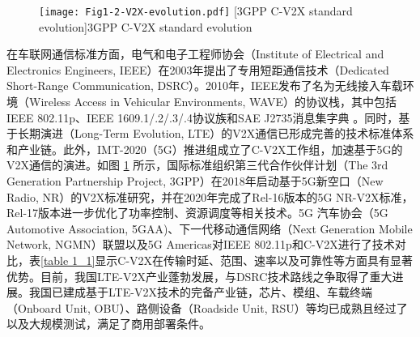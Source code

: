 \begin{figure}[h]
	\centering
\texttt{[image: Fig1-2-V2X-evolution.pdf]}
	[3GPP C-V2X standard evolution]{3GPP C-V2X standard evolution}
	\label{fig 1-2}
\end{figure}

在车联网通信标准方面，电气和电子工程师协会（Institute of Electrical and Electronics Engineers, IEEE）在2003年提出了专用短距通信技术（Dedicated Short-Range Communication, DSRC）。2010年，IEEE发布了名为无线接入车载环境（Wireless Access in Vehicular Environments, WAVE）的协议栈，其中包括IEEE 802.11p、IEEE 1609.1/.2/.3/.4协议族和SAE J2735消息集字典 \cite{wu2013vehicular}。同时，基于长期演进（Long-Term Evolution, LTE）的V2X通信已形成完善的技术标准体系和产业链\cite{chen2016lte}。此外，IMT-2020（5G）推进组成立了C-V2X工作组，加速基于5G的V2X通信的演进。如图 \ref{fig 1-2} 所示，国际标准组织第三代合作伙伴计划（The 3rd Generation Partnership Project, 3GPP）在2018年启动基于5G新空口（New Radio, NR）的V2X标准研究，并在2020年完成了Rel-16版本的5G NR-V2X标准\cite{saad2021advancements}，Rel-17版本进一步优化了功率控制、资源调度等相关技术。5G 汽车协会（5G Automotive Association, 5GAA)、下一代移动通信网络（Next Generation Mobile Network, NGMN）联盟以及5G Americas对IEEE 802.11p和C-V2X进行了技术对比，表\ref{table 1_1}显示C-V2X在传输时延、范围、速率以及可靠性等方面具有显著优势。目前，我国LTE-V2X产业蓬勃发展，与DSRC技术路线之争取得了重大进展。我国已建成基于LTE-V2X技术的完备产业链，芯片、模组、车载终端（Onboard Unit, OBU）、路侧设备（Roadside Unit, RSU）等均已成熟且经过了以及大规模测试，满足了商用部署条件。

